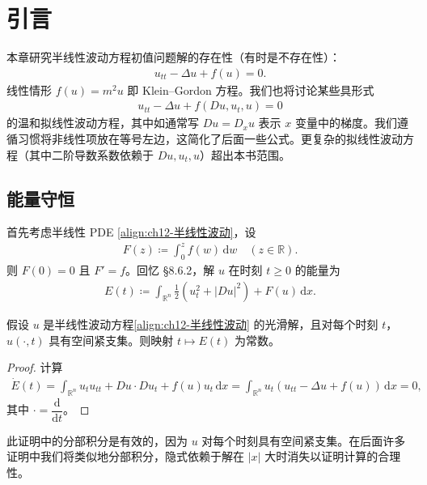 \documentclass[../../main.tex]{subfiles}
\begin{document}
\section{引言}\label{section:ch12-引言}

本章研究半线性波动方程初值问题解的存在性（有时是不存在性）：
\begin{align}
u_{tt}-\Delta u+f(u)=0.
\label{align:ch12-半线性波动}
\end{align}
线性情形 $f(u)=m^2u$ 即 Klein--Gordon 方程。我们也将讨论某些具形式
\begin{align}
u_{tt}-\Delta u+f(Du,u_t,u)=0
\label{align:ch12-拟线性波动}
\end{align}
的温和拟线性波动方程，其中如通常写 $Du=D_xu$ 表示 $x$ 变量中的梯度。我们遵循习惯将非线性项放在等号左边，这简化了后面一些公式。更复杂的拟线性波动方程（其中二阶导数系数依赖于 $Du,u_t,u$）超出本书范围。

\subsection{能量守恒}\label{subsection:ch12-能量守恒}

首先考虑半线性 PDE \eqref{align:ch12-半线性波动}，设
\begin{align}
F(z)\coloneqq\int_0^z f(w)\,\mathrm{d}w \quad (z\in\mathbb{R}).
\label{align:ch12-F定义}
\end{align}
则 $F(0)=0$ 且 $F'=f$。回忆 \S8.6.2，解 $u$ 在时刻 $t\geqslant 0$ 的能量为
\begin{align}
E(t)\coloneqq\int_{\mathbb{R}^n}\frac{1}{2}(u_t^2+|Du|^2)+F(u)\,\mathrm{d}x.
\label{align:ch12-能量}
\end{align}

\begin{theorem}[能量守恒。]\label{theorem:ch12-能量守恒}假设 $u$ 是半线性波动方程\eqref{align:ch12-半线性波动} 的光滑解，且对每个时刻 $t$，$u(\cdot,t)$ 具有空间紧支集。则映射 $t\mapsto E(t)$ 为常数。
\end{theorem}

\begin{proof}
计算
\begin{align*}
\dot{E}(t)=\int_{\mathbb{R}^n}u_tu_{tt}+Du\cdot Du_t+f(u)u_t\,\mathrm{d}x=\int_{\mathbb{R}^n}u_t(u_{tt}-\Delta u+f(u))\,\mathrm{d}x=0,
\end{align*}
其中 $\cdot=\dfrac{\mathrm{d}}{\mathrm{d}t}$。
\end{proof}

此证明中的分部积分是有效的，因为 $u$ 对每个时刻具有空间紧支集。在后面许多证明中我们将类似地分部积分，隐式依赖于解在 $|x|$ 大时消失以证明计算的合理性。
\end{document}
